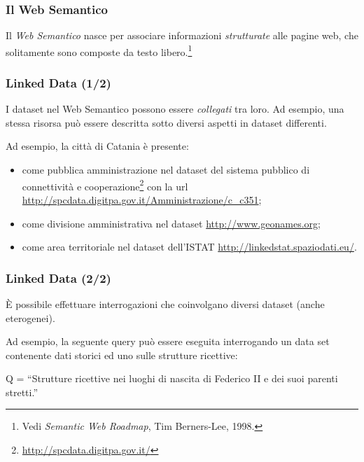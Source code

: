 \documentclass[8pt]{beamer}
\begin{document}
\begin{frame}
\frametitle{Il Web Semantico}

 Il \emph{Web Semantico} nasce per associare informazioni 
 \emph{strutturate} alle pagine web, che solitamente sono
 composte da testo libero.\footnote{Vedi \emph{Semantic Web Roadmap}, Tim Berners-Lee, 1998.}
 \vspace{\baselineskip}


\end{frame}

\begin{frame}
\frametitle{Linked Data (1/2)}

I dataset nel Web Semantico possono essere \emph{collegati} tra loro. Ad esempio, una stessa risorsa pu\`o essere descritta 
sotto diversi aspetti in dataset differenti.
\vspace{\baselineskip}

Ad esempio, la citt\`a di Catania \`e presente:
\begin{itemize}
 \item come pubblica amministrazione nel dataset del sistema pubblico di connettivit\`a e cooperazione\footnote{\url{http://spcdata.digitpa.gov.it/}}
 con la url \url{http://spcdata.digitpa.gov.it/Amministrazione/c_c351};
 \item come divisione amministrativa nel dataset \url{http://www.geonames.org};
 \item come area territoriale nel dataset dell'ISTAT  \url{http://linkedstat.spaziodati.eu/}.
\end{itemize}
\end{frame}

\begin{frame}
\frametitle{Linked Data (2/2)}
\`E possibile effettuare interrogazioni che coinvolgano diversi
dataset (anche eterogenei).
\vspace{\baselineskip}

Ad esempio, la seguente query pu\`o essere eseguita
interrogando un data set contenente dati storici ed uno 
sulle strutture ricettive:


\begin{center}
Q = “Strutture ricettive nei luoghi di nascita di Federico II e dei suoi parenti stretti.”
\end{center}
\end{frame}
\end{document}
